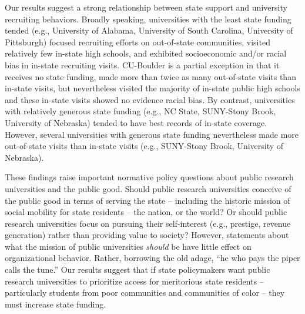\documentclass[twoside]{article}
\begin{document}
Our results suggest a strong relationship between state support and university recruiting behaviors.  Broadly speaking, universities with the least state funding tended (e.g., University of Alabama, University of South Carolina, University of Pittsburgh) focused recruiting efforts on out-of-state communities, visited relatively few in-state high schools, and exhibited socioeconomic and/or racial bias in in-state recruiting visits.  CU-Boulder is a partial exception in that it receives no state funding, made more than twice as many out-of-state visits than in-state visits, but nevertheless visited the majority of in-state public high schools and these in-state visits showed no evidence racial bias. By contrast, universities with relatively generous state funding (e.g., NC State, SUNY-Stony Brook, University of Nebraska) tended to have best records of in-state coverage. However, several universities with generous state funding nevertheless made more out-of-state visits than in-state visits (e.g., SUNY-Stony Brook, University of Nebraska).

These findings raise important normative policy questions about public research universities and the public good. Should public research universities conceive of the public good in terms of serving the state -- including the historic mission of social mobility for state residents -- the nation, or the world? Or should public research universities focus on pursuing their self-interest (e.g., prestige, revenue generation) rather than providing value to society? However, statements about what the mission of public universities \textit{should} be have little effect on organizational behavior. Rather, borrowing the old adage,
``he who pays the piper calls the tune.'' Our results suggest that if state policymakers want public research universities to prioritize access for meritorious state residents -- particularly students from poor communities and communities of color -- they must increase state funding.


\end{document}
